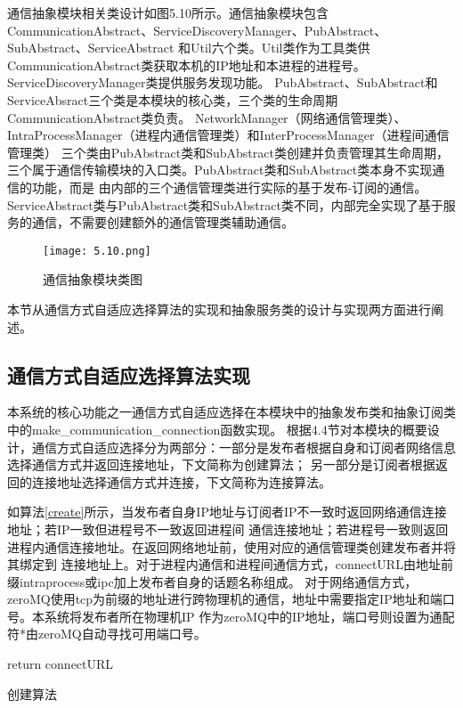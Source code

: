 通信抽象模块相关类设计如图5.10所示。通信抽象模块包含CommunicationAbstract、ServiceDiscoveryManager、PubAbstract、SubAbstract、ServiceAbstract
和Util六个类。Util类作为工具类供CommunicationAbstract类获取本机的IP地址和本进程的进程号。ServiceDiscoveryManager类提供服务发现功能。
PubAbstract、SubAbstract和ServiceAbsract三个类是本模块的核心类，三个类的生命周期CommunicationAbstract类负责。
NetworkManager（网络通信管理类）、IntraProcessManager（进程内通信管理类）和InterProcessManager（进程间通信管理类）
三个类由PubAbstract类和SubAbstract类创建并负责管理其生命周期，三个属于通信传输模块的入口类。PubAbstract类和SubAbstract类本身不实现通信的功能，而是
由内部的三个通信管理类进行实际的基于发布-订阅的通信。
ServiceAbstract类与PubAbstract类和SubAbstract类不同，内部完全实现了基于服务的通信，不需要创建额外的通信管理类辅助通信。
\begin{figure}[H]
  \centering
  \texttt{[image: 5.10.png]}
  \caption{通信抽象模块类图}
  \label{fig:10}
\end{figure}

本节从通信方式自适应选择算法的实现和抽象服务类的设计与实现两方面进行阐述。

\subsection{通信方式自适应选择算法实现}
本系统的核心功能之一通信方式自适应选择在本模块中的抽象发布类和抽象订阅类中的make\_communication\_connection函数实现。
根据4.4节对本模块的概要设计，通信方式自适应选择分为两部分：一部分是发布者根据自身和订阅者网络信息选择通信方式并返回连接地址，下文简称为创建算法；
另一部分是订阅者根据返回的连接地址选择通信方式并连接，下文简称为连接算法。

如算法\ref{create}所示，当发布者自身IP地址与订阅者IP不一致时返回网络通信连接地址；若IP一致但进程号不一致返回进程间
通信连接地址；若进程号一致则返回进程内通信连接地址。在返回网络地址前，使用对应的通信管理类创建发布者并将其绑定到
连接地址上。对于进程内通信和进程间通信方式，connectURL由地址前缀intraprocess或ipc加上发布者自身的话题名称组成。
对于网络通信方式，zeroMQ使用tcp为前缀的地址进行跨物理机的通信，地址中需要指定IP地址和端口号。本系统将发布者所在物理机IP
作为zeroMQ中的IP地址，端口号则设置为通配符*由zeroMQ自动寻找可用端口号。
\begin{algorithm}
  \small
  \SetAlgoLined

  return connectURL
  \caption{创建算法}
  \label{create}
\end{algorithm}

